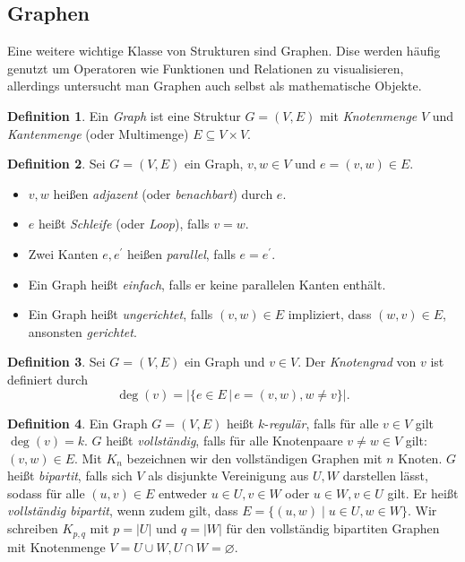 \documentclass[11pt, a4paper]{article}
\theoremstyle{definition}
\newtheorem{definition}{Definition}[section]
\theoremstyle{plain}
\numberwithin{equation}{section}
\let\emptyset\varnothing
\begin{document}
\subsection{Graphen}\label{sec:pre_graphs}
Eine weitere wichtige Klasse von Strukturen sind Graphen. Dise werden häufig genutzt um Operatoren wie Funktionen und Relationen zu visualisieren, allerdings untersucht man Graphen auch selbst als mathematische Objekte.
\begin{definition}
	Ein \textit{Graph} ist eine Struktur \( G = (V, E) \) mit \textit{Knotenmenge} \( V \) und \textit{Kantenmenge} (oder Multimenge) \( E \subseteq V \times V \).
\end{definition}
\begin{definition}
	Sei \( G = (V, E) \) ein Graph, \( v, w \in V \) und \( e = (v, w) \in E \).
	\begin{itemize}
		\item \( v, w \) heißen \textit{adjazent} (oder \textit{benachbart}) durch \( e \).
		\item \( e \) heißt \textit{Schleife} (oder \textit{Loop}), falls \( v = w \).
		\item Zwei Kanten \( e, e^\prime \) heißen \textit{parallel}, falls \( e = e^\prime \).
		\item Ein Graph heißt \textit{einfach}, falls er keine parallelen Kanten enthält.
		\item Ein Graph heißt \textit{ungerichtet}, falls \( (v, w) \in E \) impliziert, dass \( (w, v) \in E \), ansonsten \textit{gerichtet}. 
	\end{itemize}
\end{definition}
\begin{definition}
	Sei \( G = (V, E) \) ein Graph und \( v \in V \). Der \textit{Knotengrad} von \( v \) ist definiert durch
	\[
		\deg(v) = \left| \{ e \in E \,\vert\, e = (v, w), w \neq v \} \right|.
	\]
\end{definition}
\begin{definition}
	Ein Graph \( G = (V, E) \) heißt \( k \)-\textit{regulär}, falls für alle \( v \in V \) gilt \( \deg(v) = k \).
	\( G \) heißt \textit{vollständig}, falls für alle Knotenpaare \( v \neq w \in V \) gilt: \( (v, w) \in E \). Mit \( K_n \) bezeichnen wir den vollständigen Graphen mit \( n \) Knoten.
	\( G \) heißt \textit{bipartit}, falls sich \( V \) als disjunkte Vereinigung aus \( U, W \) darstellen lässt, sodass für alle \( (u, v) \in E \) entweder \( u \in U, v \in W \) oder \( u \in W, v \in U \) gilt. Er heißt \textit{vollständig bipartit}, wenn zudem gilt, dass \( E = \{ (u, w) \mid u \in U, w \in W \} \). Wir schreiben \( K_{p,q} \) mit \( p = \left| U \right| \) und \( q = \left| W \right| \) für den vollständig bipartiten Graphen mit Knotenmenge \( V = U \cup W, U \cap W = \emptyset \).
\end{definition}
\end{document}
